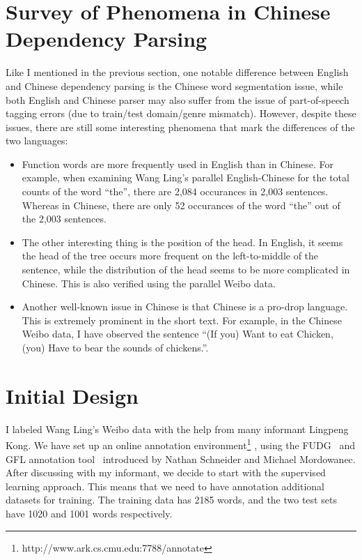 \documentclass[11pt,letterpaper]{article}
\begin{document}
\section{Survey of Phenomena in Chinese Dependency Parsing}
Like I mentioned in the previous section,
one notable difference between English and Chinese dependency parsing is the Chinese word segmentation issue,
while both English and Chinese parser may also suffer from the issue of part-of-speech tagging errors (due to train/test domain/genre mismatch).
However, despite these issues, there are still some interesting phenomena that mark the differences of the two languages:
\begin{itemize}
\item Function words are more frequently used in English than in Chinese.
For example, when examining Wang Ling's parallel English-Chinese for the total counts of the word ``the'',
there are 2,084 occurances in 2,003 sentences. Whereas in Chinese, there are only 52 occurances of the word 	``the'' 
out of the 2,003 sentences.
\item The other interesting thing is the position of the head. In English, it seems the head of the tree occurs more frequent
on the left-to-middle of the sentence, while the distribution of the head seems to be more complicated in Chinese.
This is also verified using the parallel Weibo data.
\item Another well-known issue in Chinese is that Chinese is a pro-drop language. 
This is extremely prominent in the short text. For example, in the Chinese Weibo data,
I have observed the sentence ``(If you) Want to eat Chicken, (you) Have to  bear the sounds of chickens.''.
\end{itemize}

\section{Initial Design}
I labeled Wang Ling's Weibo data with the help from many informant Lingpeng Kong.
We have set up an online annotation environment\footnote{http://www.ark.cs.cmu.edu:7788/annotate} ,
using the FUDG~\citep{schneider2013framework} and GFL annotation tool~\citep{chrissimplified} introduced by Nathan Schneider and Michael Mordowanec.
After discussing with my informant, we decide to start with the supervised learning approach.
This means that we need to have annotation additional datasets for training.
The training data has 2185 words, and the two test sets have 1020 and 1001 words respectively.
\end{document}
